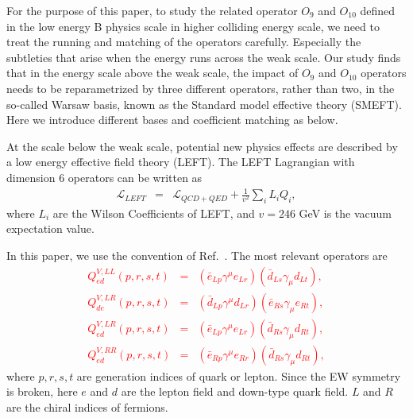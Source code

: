 \documentclass[a4paper,11pt]{article}
\begin{document}
For the purpose of this paper, to study the related operator $O_9$ and $O_{10}$ defined in the low energy B physics scale in higher colliding energy scale, 
we need to treat the running and matching of the operators carefully. 
Especially the subtleties that arise when the energy runs across the weak scale. 
Our study finds that in the energy scale above the weak scale, 
the impact of $O_9$ and $O_{10}$ operators needs to be reparametrized by three different operators, 
rather than two, in the so-called Warsaw basis, known as the Standard model effective theory (SMEFT). 
Here we introduce different bases and coefficient matching as below. 

At the scale below the weak scale, potential new physics effects are described by a low energy effective field theory (LEFT).  
The LEFT Lagrangian with dimension 6 operators can be written as 
\begin{eqnarray}
  \mathcal{L}_{LEFT} &=& \mathcal{L}_{QCD+QED}+ \frac{1}{v^2}\sum_{i}L_iQ_i,  \nonumber 
\end{eqnarray} 
where $L_i$ are the Wilson Coefficients of LEFT, and $v=246$ GeV is the vacuum expectation value. 

In this paper, we use the convention of Ref.~\cite{Jenkins:2017jig}. 
The most relevant operators are 
\textcolor{red}{
\begin{eqnarray}
  Q^{V,LL}_{ed}(p,r,s,t) &=& (\bar{e}_{Lp}\gamma^\mu e_{Lr})(\bar{d}_{Ls}\gamma_\mu d_{Lt}),  \label{QVLLed} \\
  Q^{V,LR}_{de}(p,r,s,t) &=& (\bar{d}_{Lp}\gamma^\mu d_{Lr})(\bar{e}_{Rs}\gamma_\mu e_{Rt}),  \label{QVLRde} \\
  Q^{V,LR}_{ed}(p,r,s,t) &=& (\bar{e}_{Lp}\gamma^\mu e_{Lr})(\bar{d}_{Rs}\gamma_\mu d_{Rt}),  \label{QVLRed} \\
  Q^{V,RR}_{ed}(p,r,s,t) &=& (\bar{e}_{Rp}\gamma^\mu e_{Rr})(\bar{d}_{Rs}\gamma_\mu d_{Rt}),  \label{QVRRed}
\end{eqnarray}
}
where $p,r,s,t$ are generation indices of quark or lepton. 
Since the EW symmetry is broken, here $e$ and $d$ are the lepton field and down-type quark field. 
$L$ and $R$ are the chiral indices of fermions. 
\end{document}
